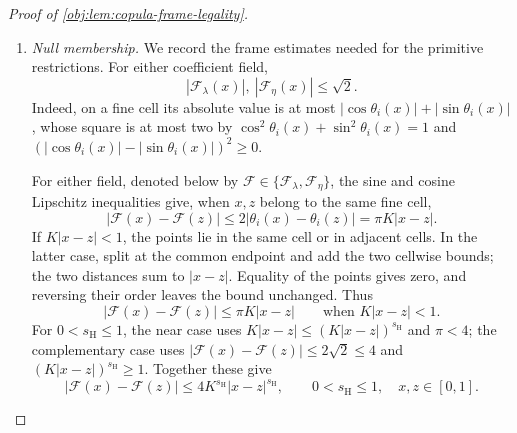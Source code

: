 \begin{proof}[Proof of \cref{obj:lem:copula-frame-legality}]
\begin{enumerate}
Summing the signed marked outcomes within each arm also gives
\[
\begin{aligned}
e_P(x)&=\frac{1+\xi(x)}2,\\
m_{0,P}(x)
&=\varepsilon L\frac{\upsilon(x)-\zeta(x)}{1-\xi(x)}
 =\varepsilon L\{\upsilon(x)-t_\nu(x)(1+\xi(x))\},\\
m_{1,P}(x)
&=\varepsilon L\frac{\upsilon(x)+\zeta(x)}{1+\xi(x)}
 =\varepsilon L\{\upsilon(x)+t_\nu(x)(1-\xi(x))\},\\
\tau_P(x)&=2\varepsilon L t_\nu(x).
\end{aligned}
\]
All denominators are positive because \(|\xi(x)|\le1/8\).

\item \textit{Null membership.}
We record the frame estimates needed for the primitive restrictions. For either coefficient field,
\[
|\mathcal F_\lambda(x)|,\ |\mathcal F_\eta(x)|
\le\sqrt2.
\]
Indeed, on a fine cell its absolute value is at most
\(|\cos\theta_i(x)|+|\sin\theta_i(x)|\), whose square is at most two by
\(\cos^2\theta_i(x)+\sin^2\theta_i(x)=1\) and
\((|\cos\theta_i(x)|-|\sin\theta_i(x)|)^2\ge0\).

For either field, denoted below by
\(\mathcal F\in\{\mathcal F_\lambda,\mathcal F_\eta\}\), the sine and cosine Lipschitz inequalities give, when \(x,z\) belong to the same fine cell,
\[
|\mathcal F(x)-\mathcal F(z)|
\le2|\theta_i(x)-\theta_i(z)|
=\pi K|x-z|.
\]
If \(K|x-z|<1\), the points lie in the same cell or in adjacent cells. In the latter case, split at the common endpoint and add the two cellwise bounds; the two distances sum to \(|x-z|\). Equality of the points gives zero, and reversing their order leaves the bound unchanged. Thus
\[
|\mathcal F(x)-\mathcal F(z)|
\le\pi K|x-z|
\qquad\text{when }K|x-z|<1.
\]
For \(0<s_{\mathrm H}\le1\), the near case uses
\(K|x-z|\le(K|x-z|)^{s_{\mathrm H}}\) and \(\pi<4\); the complementary case uses
\(|\mathcal F(x)-\mathcal F(z)|\le2\sqrt2\le4\) and
\((K|x-z|)^{s_{\mathrm H}}\ge1\). Together these give
\[
|\mathcal F(x)-\mathcal F(z)|
\le4K^{s_{\mathrm H}}|x-z|^{s_{\mathrm H}},
\qquad
0<s_{\mathrm H}\le1,\quad x,z\in[0,1].
\]


\end{enumerate}
\end{proof}
